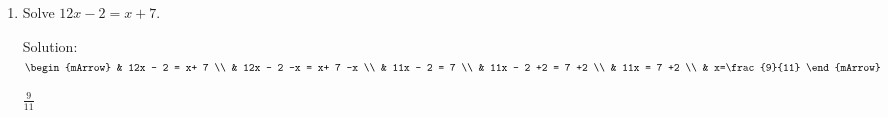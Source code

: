 \clearpage\noindent%
\begin{enumerate}[resume]
    \item Solve $12x - 2 = x+ 7$.
	    \begin{exercise} 
            \begin{envSolution}
		        Solution:\\[0.5cm]
                    $\begin{mArrow}
                                  &  12x - 2 = x+ 7     \\
							      &  12x - 2 -x = x+ 7 -x        \\
     						      &  11x - 2  =  7                     \\ 
             					  &  11x - 2 +2   =  7 +2         \\
								  &  11x    =  7 +2          \\
								  & x=\frac{9}{11}
					 \end{mArrow}$			   
                     \begin{shortsolution}  
				           $  \frac{9}{11} $
			         \end{shortsolution}				 
            \end{envSolution}
        \end{exercise}
	

\end{enumerate}
